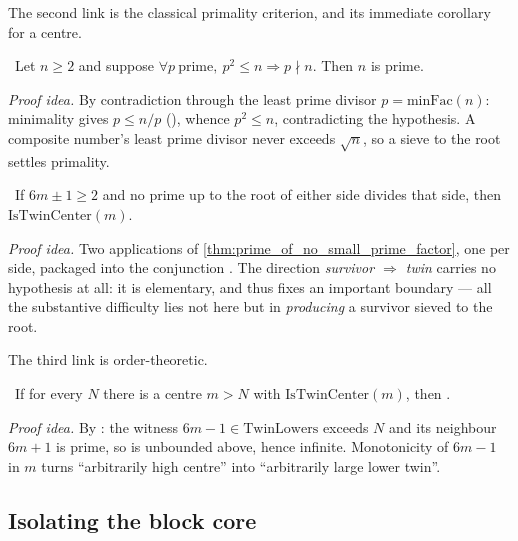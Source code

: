 The second link is the classical primality criterion, and its immediate corollary for a centre.

\begin{theorem}\label{thm:prime_of_no_small_prime_factor}
\green{}\ Let $n\ge 2$ and suppose $\forall p\ \text{prime},\ p^2\le n\Rightarrow p\nmid n$. Then $n$
is prime. 
\end{theorem}

\emph{Proof idea.} By contradiction through the least prime divisor $p=\mathrm{minFac}(n)$:
minimality gives $p\le n/p$ (), whence $p^2\le n$, contradicting the
hypothesis. A composite number's least prime divisor never exceeds $\sqrt n$, so a sieve to the root
settles primality.

\begin{theorem}\label{thm:isTwinCenter_of_root_sieve}
\green{}\ If $6m\pm1\ge 2$ and no prime up to the root of either side divides that side, then
$\mathrm{IsTwinCenter}(m)$. 
\end{theorem}

\emph{Proof idea.} Two applications of \cref{thm:prime_of_no_small_prime_factor}, one per side,
packaged into the conjunction . The direction \emph{survivor $\Rightarrow$ twin}
carries no hypothesis at all: it is elementary, and thus fixes an important boundary --- all the
substantive difficulty lies not here but in \emph{producing} a survivor sieved to the root.

The third link is order-theoretic.

\begin{theorem}\label{thm:infinite_of_unbounded_centers}
\green{}\ If for every $N$ there is a centre $m>N$ with $\mathrm{IsTwinCenter}(m)$, then
. 
\end{theorem}

\emph{Proof idea.} By : the witness $6m-1\in\mathrm{TwinLowers}$
exceeds $N$ and its neighbour $6m+1$ is prime, so  is unbounded above, hence
infinite. Monotonicity of $6m-1$ in $m$ turns ``arbitrarily high centre'' into ``arbitrarily large
lower twin''.

\subsection{Isolating the block core}

